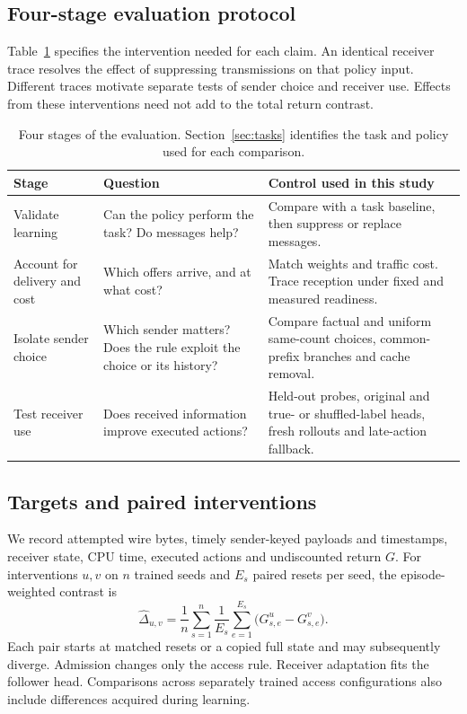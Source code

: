 \documentclass[pdflatex,sn-mathphys-num]{sn-jnl}
\begin{document}
\subsection{Four-stage evaluation protocol}
Table~\ref{tab:evaluation_protocol} specifies the intervention needed for each claim. An identical receiver trace resolves the effect of suppressing transmissions on that policy input. Different traces motivate separate tests of sender choice and receiver use. Effects from these interventions need not add to the total return contrast.
\begin{table}[htbp]\centering\normalsize
\caption{Four stages of the evaluation. Section~\ref{sec:tasks} identifies the task and policy used for each comparison.}\label{tab:evaluation_protocol}
\begin{tabularx}{\textwidth}{@{}>{\RaggedRight\arraybackslash}p{}XX@{}}
\toprule
Stage & Question & Control used in this study\\\midrule
Validate learning & Can the policy perform the task? Do messages help? & Compare with a task baseline, then suppress or replace messages.\\[2pt]
Account for delivery and cost & Which offers arrive, and at what cost? & Match weights and traffic cost. Trace reception under fixed and measured readiness.\\[2pt]
Isolate sender choice & Which sender matters? Does the rule exploit the choice or its history? & Compare factual and uniform same-count choices, common-prefix branches and cache removal.\\[2pt]
Test receiver use & Does received information improve executed actions? & Held-out probes, original and true- or shuffled-label heads, fresh rollouts and late-action fallback.\\
\bottomrule\end{tabularx}
\end{table}


\subsection{Targets and paired interventions}
We record attempted wire bytes, timely sender-keyed payloads and timestamps, receiver state, CPU time, executed actions and undiscounted return $G$. For interventions $u,v$ on $n$ trained seeds and $E_s$ paired resets per seed, the episode-weighted contrast is
\begin{equation}
 \widehat{\Delta}_{u,v}=\frac{1}{n}\sum_{s=1}^{n}\frac{1}{E_s}
       \sum_{e=1}^{E_s}\bigl(G_{s,e}^{u}-G_{s,e}^{v}\bigr).
 \label{eq:episode_effect}
\end{equation}
Each pair starts at matched resets or a copied full state and may subsequently diverge. Admission changes only the access rule. Receiver adaptation fits the follower head. Comparisons across separately trained access configurations also include differences acquired during learning.
\end{document}

